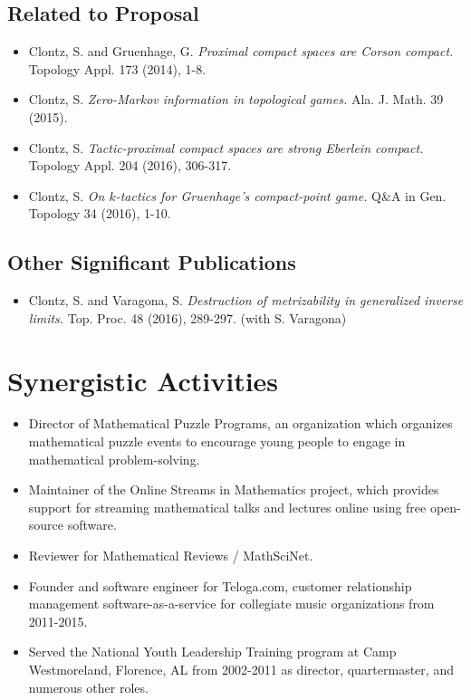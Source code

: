 \subsection{Related to Proposal}

\begin{itemize}
  \item Clontz, S. and Gruenhage, G.
    \textit{Proximal compact spaces are Corson compact.}
    Topology Appl. 173 (2014), 1-8.
  \item Clontz, S.
    \textit{Zero-Markov information in topological games.}
    Ala. J. Math. 39 (2015).
  \item Clontz, S.
    \textit{Tactic-proximal compact spaces are strong Eberlein compact.}
    Topology Appl. 204 (2016), 306-317.
  \item Clontz, S.
    \textit{On \(k\)-tactics for Gruenhage's compact-point game.}
    Q\&A in Gen. Topology 34 (2016), 1-10.
\end{itemize}

\subsection{Other Significant Publications}

\begin{itemize}
  \item Clontz, S. and Varagona, S.
    \textit{Destruction of metrizability in generalized inverse limits.}
    Top. Proc. 48 (2016), 289-297. (with S. Varagona)
\end{itemize}


\section{Synergistic Activities}

\begin{itemize}
  \item Director of Mathematical Puzzle Programs, an organization which
        organizes mathematical puzzle events to encourage young people to
        engage in mathematical problem-solving.
  \item Maintainer of the Online Streams in Mathematics project, which
        provides support for streaming mathematical talks and lectures online
        using free open-source software.
  \item Reviewer for Mathematical Reviews / MathSciNet.
  \item Founder and software engineer for Teloga.com, customer relationship
        management software-as-a-service for collegiate music organizations
        from 2011-2015.
  \item Served the National Youth Leadership Training program at Camp Westmoreland,
        Florence, AL from 2002-2011 as director, quartermaster, and
        numerous other roles.
\end{itemize}

